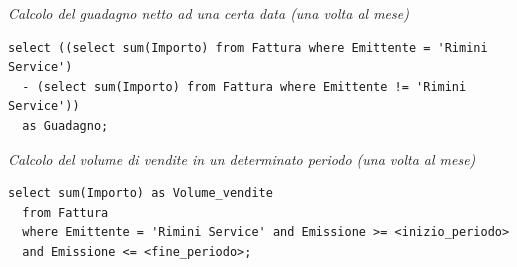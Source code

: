 \noindent{}
\newline\newline

\noindent\textit{Calcolo del guadagno netto ad una certa data (una volta al mese)}
\begin{verbatim}
select ((select sum(Importo) from Fattura where Emittente = 'Rimini Service')
  - (select sum(Importo) from Fattura where Emittente != 'Rimini Service'))
  as Guadagno;
\end{verbatim}
\vspace{0.5cm}

\noindent{}
\newline\newline

\noindent\textit{Calcolo del volume di vendite in un determinato periodo (una volta al mese)}
\begin{verbatim}
select sum(Importo) as Volume_vendite
  from Fattura
  where Emittente = 'Rimini Service' and Emissione >= <inizio_periodo>
  and Emissione <= <fine_periodo>;
\end{verbatim}
\vspace{0.5cm}

\noindent{}
\newline\newline

